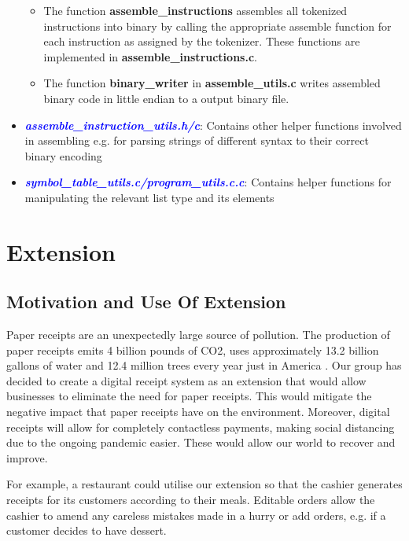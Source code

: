 \documentclass[11pt]{article}
\begin{document}
\begin{itemize}
\begin{itemize}
	    \item The function {\textbf{assemble\_instructions}} assembles all tokenized instructions into binary by calling the appropriate assemble function for each instruction as assigned by the tokenizer. These functions are implemented in {\textbf{assemble\_instructions.c}}.
	    \item The function {\textbf{binary\_writer}} in {\textbf{assemble\_utils.c}} writes assembled binary code in little endian to a output binary file.	
	\end{itemize}
	\item\textcolor{blue}{\textbf{\emph{assemble\_instruction\_utils.h/c}}}: Contains other helper functions involved in assembling e.g. for parsing strings of different syntax to their correct binary encoding
	\item \textcolor{blue}{\textbf{\emph{symbol\_table\_utils.c/program\_utils.c.c}}}: Contains helper functions for manipulating the relevant list type and its elements
\end{itemize}
\section{Extension}
\subsection{Motivation and Use Of Extension}
Paper receipts are an unexpectedly large source of pollution. The production of paper receipts emits 4 billion pounds of CO2, uses approximately 13.2 billion gallons of water and 12.4 million trees every year just in America \cite{receiptStat}. Our group has decided to create a digital receipt system as an extension that would allow businesses to eliminate the need for paper receipts. This would mitigate the negative impact that paper receipts have on the environment. Moreover, digital receipts will allow for completely contactless payments, making social distancing due to the ongoing pandemic easier. These would allow our world to recover and improve. 

For example, a restaurant could utilise our extension so that the cashier generates receipts for its customers according to their meals. Editable orders allow the cashier to amend any careless mistakes made in a hurry or add orders, e.g. if a customer decides to have dessert. 
\end{document}
